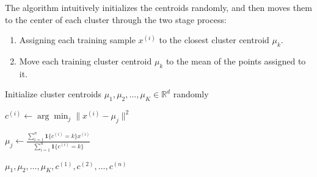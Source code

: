   \begin{algo}
    The algorithm intuitively initializes the centroids randomly, and then moves them to the center of each cluster through the two stage process: 
    \begin{enumerate}
      \item Assigning each training sample $x^{(i)}$ to the closest cluster centroid $\mu_k$. 
      \item Move each training cluster centroid $\mu_k$ to the mean of the points assigned to it. 
    \end{enumerate}
    \begin{algorithm}[H]
    \caption{K-Means Clustering}
    \label{alg:kmeans}
    \begin{algorithmic}[1]
          
      
      \State Initialize cluster centroids $\mu_1, \mu_2, \ldots, \mu_K \in \mathbb{R}^d$ randomly
      
      \Repeat
          \State $c^{(i)} \gets \arg\min_j \|x^{(i)} - \mu_j\|^2$
        \EndFor
        
          \State $\mu_j \gets \frac{\sum_{i=1}^n \mathbf{1}\{c^{(i)} = k\} x^{(i)}}{\sum_{i=1}^n \mathbf{1}\{c^{(i)} = k\}}$
        \EndFor
      
      \State \Return $\mu_1, \mu_2, \ldots, \mu_K, c^{(1)}, c^{(2)}, \ldots, c^{(n)}$
      \EndProcedure
    \end{algorithmic}
    \end{algorithm}
  \end{algo} 

